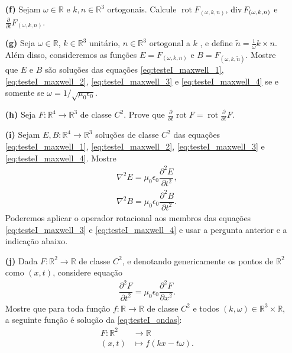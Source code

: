 \documentclass[11pt]{article}
\newcommand{\R}{\mathbb R}
\providecommand{\div}{}\renewcommand{\div}{\mathop{\rm div}\nolimits}
\DeclareMathOperator{\rot}{rot}
\begin{document}
\begin{enumerate}
\item[\textbf{(f)}] Sejam $\omega\in\R$ e $k,n\in\R^3$ ortogonais. Calcule $\rot F_{(\omega, k, n)}$, $\div F_{(\omega, k, n)}$ e $\frac{\partial}{\partial t} F_{(\omega, k, n)}$.
\item[\textbf{(g)}]
Seja $\omega\in\R$, $k\in\R^3$ unitário, $n\in\R^3$ ortogonal a $k$ , e define $\widetilde{n} = \frac{1}{\omega} k\times n$.
Além disso, consideremos as funções $E = F_{(\omega, k, n)}$ e $B = F_{(\omega, k, \widetilde{n})}$.
Mostre que $E$ e $B$ são soluções das equações \eqref{eq:testeI_maxwell_1}, \eqref{eq:testeI_maxwell_2}, \eqref{eq:testeI_maxwell_3} e \eqref{eq:testeI_maxwell_4} se e somente se $\omega = 1/\sqrt{\mu_0\epsilon_0}$.
\item[\textbf{(h)}] Seja $F\colon\R^4\rightarrow\R^3$ de classe $C^2$. Prove que $\frac{\partial}{\partial t} \rot F = \rot \frac{\partial}{\partial t} F$.
\item[\textbf{(i)}] 
Sejam $E,B\colon\R^4\rightarrow\R^3$ soluções de classe $C^2$ das equações \eqref{eq:testeI_maxwell_1}, \eqref{eq:testeI_maxwell_2}, \eqref{eq:testeI_maxwell_3} e \eqref{eq:testeI_maxwell_4}.
Mostre
\begin{align}
\nabla^2 E = \mu_0\epsilon_0 \dfrac{\partial^2 E}{\partial t^2}, \label{eq:testeI_ondas_1}\\
\nabla^2 B = \mu_0\epsilon_0 \dfrac{\partial^2 B}{\partial t^2}. \label{eq:testeI_ondas_2}
\end{align}
Poderemos aplicar o operador rotacional aos membros das equações \eqref{eq:testeI_maxwell_3} e \eqref{eq:testeI_maxwell_4} e usar a pergunta anterior e a indicação abaixo.
\item[\textbf{(j)}] 
Dada $F\colon\R^2\rightarrow\R$ de classe $C^2$, e denotando genericamente os pontos de $\R^2$ como $(x,t)$, considere equação
\begin{align}
\dfrac{\partial^2 F}{\partial t^2} = \mu_0\epsilon_0 \dfrac{\partial^2 F}{\partial x^2}. \label{eq:testeI_ondas}
\end{align}
Mostre que para toda função $f\colon\R\rightarrow\R$ de classe $C^2$ e todos $(k,\omega)\in\R^3\times\R$, a seguinte função é solução da \cref{eq:testeI_ondas}:
\begin{align*}
F\colon \R^2&\longrightarrow\R\\
(x,t)&\longmapsto f( kx - t\omega ).
\end{align*}
\end{enumerate}
\end{document}
